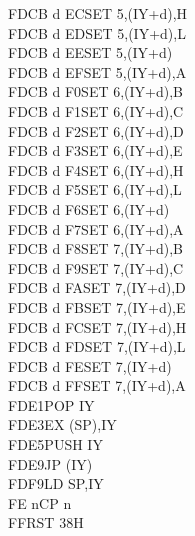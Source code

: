 \documentclass[12pt,twoside,openright,a4paper]{book}
\begin{document}
\begin{multicols}{3}
{\begin{tabbing}
	FDCB d EC\>SET 5,(IY+d),H\UNDOC\\
	FDCB d ED\>SET 5,(IY+d),L\UNDOC\\
	FDCB d EE\>SET 5,(IY+d)\\
	FDCB d EF\>SET 5,(IY+d),A\UNDOC\\
	FDCB d F0\>SET 6,(IY+d),B\UNDOC\\
	FDCB d F1\>SET 6,(IY+d),C\UNDOC\\
	FDCB d F2\>SET 6,(IY+d),D\UNDOC\\
	FDCB d F3\>SET 6,(IY+d),E\UNDOC\\
	FDCB d F4\>SET 6,(IY+d),H\UNDOC\\
	FDCB d F5\>SET 6,(IY+d),L\UNDOC\\
	FDCB d F6\>SET 6,(IY+d)\\
	FDCB d F7\>SET 6,(IY+d),A\UNDOC\\
	FDCB d F8\>SET 7,(IY+d),B\UNDOC\\
	FDCB d F9\>SET 7,(IY+d),C\UNDOC\\
	FDCB d FA\>SET 7,(IY+d),D\UNDOC\\
	FDCB d FB\>SET 7,(IY+d),E\UNDOC\\
	FDCB d FC\>SET 7,(IY+d),H\UNDOC\\
	FDCB d FD\>SET 7,(IY+d),L\UNDOC\\
	FDCB d FE\>SET 7,(IY+d)\\
	FDCB d FF\>SET 7,(IY+d),A\UNDOC\\
	FDE1\>POP IY\\
	FDE3\>EX (SP),IY\\
	FDE5\>PUSH IY\\
	FDE9\>JP (IY)\\
	FDF9\>LD SP,IY\\
	FE n\>CP n\\
	FF\>RST 38H
\end{tabbing}
}
\end{multicols}
\normalsize

\pagebreak
\IntentionallyEmpty
\pagebreak



\end{document}
